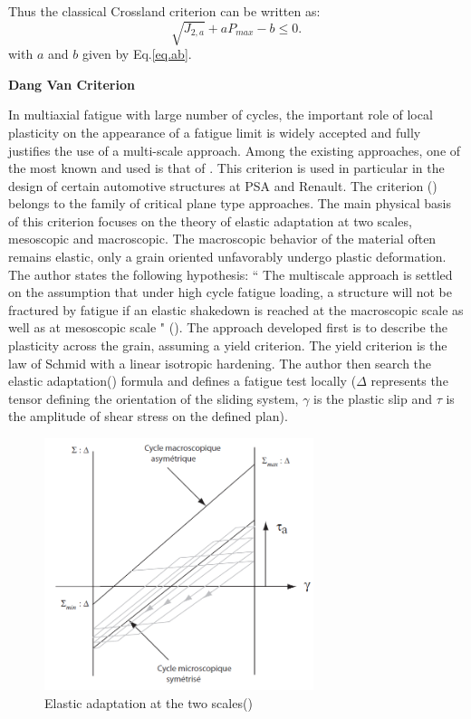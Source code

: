 Thus the classical Crossland criterion can be written as:
\begin{equation}
\sqrt{J_{2,a}}+a{P_{max}}-b\leqslant 0 .
\end{equation}
with $a$ and $b$ given by Eq.\eqref{eq.ab}.

\textbf{Dang Van Criterion}

In multiaxial fatigue with large number of cycles, the important role of local plasticity on the appearance of a fatigue limit is widely accepted and fully justifies the use of a multi-scale approach. Among the existing approaches, one of the most known and used is that of \cite{van1999introduction}. This criterion is used in particular in the design of certain automotive structures at PSA and
Renault. The criterion (\cite{van1986criterion}) belongs to the family of critical plane type approaches. The main physical
basis of this criterion focuses on the theory of elastic adaptation at two scales, mesoscopic and macroscopic. The macroscopic behavior of the material often remains elastic, only a grain oriented unfavorably undergo
plastic deformation. The author states the following hypothesis: `` The
multiscale approach is settled on the assumption that under high cycle fatigue loading, a structure
will not be fractured by fatigue if an elastic shakedown is reached at the macroscopic scale as well
as at mesoscopic scale " (\cite{van1999introduction}). The approach developed first is
to describe the plasticity across the grain, assuming a yield criterion. The yield criterion is the law of Schmid with a
linear isotropic hardening. The author then search the elastic adaptation() formula and defines a fatigue
test locally ($\Delta$ represents the tensor defining the orientation of the sliding system, $\gamma$ is the plastic slip  and $\tau$
is the amplitude of shear stress on the defined plan).
\begin{figure}[!h]
	\centering
	\includegraphics[width=0.7\textwidth]{figures//DV.png} 
	\caption{Elastic adaptation at the two scales(\cite{van1999introduction})}
	\label{figDV}
\end{figure}
